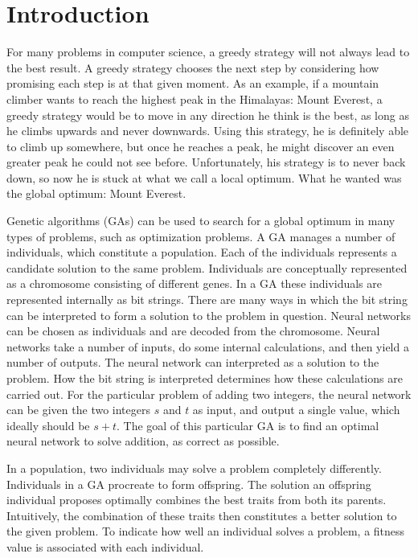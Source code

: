 \section{Introduction}
For many problems in computer science, a greedy strategy will not always lead to the best result. A greedy strategy chooses the next step by considering how promising each step is at that given moment. As an example, if a mountain climber wants to reach the highest peak in the Himalayas: Mount Everest, a greedy strategy would be to move in any direction he think is the best, as long as he climbs upwards and never downwards. Using this strategy, he is definitely able to climb up somewhere, but once he reaches a peak, he might discover an even greater peak he could not see before. Unfortunately, his strategy is to never back down, so now he is stuck at what we call a local optimum. What he wanted was the global optimum: Mount Everest.
 
Genetic algorithms (GAs) can be used to search for a global optimum in many types of problems, such as optimization problems. A GA manages a number of individuals, which constitute a population. Each of the individuals represents a candidate solution to the same problem. Individuals are conceptually represented as a chromosome consisting of different genes. In a GA these individuals are represented internally as bit strings. There are many ways in which the bit string can be interpreted to form a solution to the problem in question. Neural networks can be chosen as individuals and are decoded from the chromosome. Neural networks take a number of inputs, do some internal calculations, and then yield a number of outputs.
The neural network can interpreted as a solution to the problem.
How the bit string is interpreted determines how these calculations are carried out. For the particular problem of adding two integers, the neural network can be given the two integers $s$ and $t$ as input, and output a single value, which ideally should be $s + t$. The goal of this particular GA is to find an optimal neural network to solve addition, as correct as possible.

In a population, two individuals may solve a problem completely differently. Individuals in a GA procreate to form offspring. The solution an offspring individual proposes optimally combines the best traits from both its parents. Intuitively, the combination of these traits then constitutes a better solution to the given problem. To indicate how well an individual solves a problem, a fitness value is associated with each individual.


